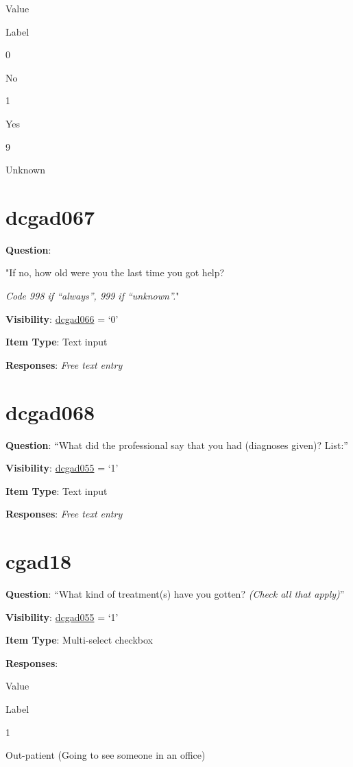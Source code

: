 \documentclass[]{book}
\begin{document}
Value

Label

0

No

1

Yes

9

Unknown

\hypertarget{dcgad067}{%
\section{dcgad067}\label{dcgad067}}

\textbf{Question}:

"If no, how old were you the last time you got help?

\emph{Code 998 if ``always'', 999 if ``unknown''.}"

\textbf{Visibility}: \protect\hyperlink{dcgad066}{dcgad066} = `0'

\textbf{Item Type}: Text input

\textbf{Responses}: \emph{Free text entry}

\hypertarget{dcgad068}{%
\section{dcgad068}\label{dcgad068}}

\textbf{Question}: ``What did the professional say that you had (diagnoses given)? List:''

\textbf{Visibility}: \protect\hyperlink{dcgad055}{dcgad055} = `1'

\textbf{Item Type}: Text input

\textbf{Responses}: \emph{Free text entry}

\hypertarget{cgad18}{%
\section{cgad18}\label{cgad18}}

\textbf{Question}: ``What kind of treatment(s) have you gotten? \emph{(Check all that apply)}''

\textbf{Visibility}: \protect\hyperlink{dcgad055}{dcgad055} = `1'

\textbf{Item Type}: Multi-select checkbox

\textbf{Responses}:

Value

Label

1

Out-patient (Going to see someone in an office)
\end{document}
